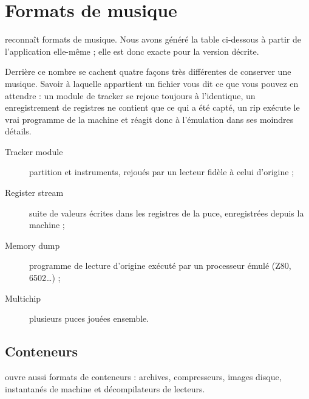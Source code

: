 \chapter{Formats de musique}
\soft{} reconnaît \lhunaModulesCount{} formats de musique. Nous avons généré la table ci-dessous à partir de
l'application elle-même ; elle est donc exacte pour la version décrite.

Derrière ce nombre se cachent quatre façons très différentes de conserver une musique. Savoir à laquelle appartient
un fichier vous dit ce que vous pouvez en attendre : un module de tracker se rejoue toujours à l'identique, un
enregistrement de registres ne contient que ce qui a été capté, un rip exécute le vrai programme de la machine et
réagit donc à l'émulation dans ses moindres détails.

\begin{description}
  \item[Tracker module] partition et instruments, rejoués par un lecteur fidèle à celui d'origine ;
  \item[Register stream] suite de valeurs écrites dans les registres de la puce, enregistrées depuis la machine ;
  \item[Memory dump] programme de lecture d'origine exécuté par un processeur émulé (Z80, 6502\dots) ;
  \item[Multichip] plusieurs puces jouées ensemble.
\end{description}


{\small\lhunaFormatsTable}

\section{Conteneurs}
\soft{} ouvre aussi \lhunaContainersCount{} formats de conteneurs : archives, compresseurs, images disque,
instantanés de machine et décompilateurs de lecteurs.

{\small\lhunaContainersTable}
